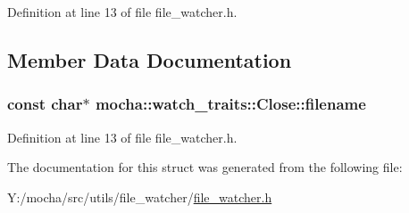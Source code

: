 Definition at line 13 of file file\_\-watcher.h.



\subsection{Member Data Documentation}
\hypertarget{structmocha_1_1watch__traits_1_1_close_a17079e4e7c253c7b27ca9c8a4ea17e28}{
\subsubsection[{filename}]{\setlength{\rightskip}{0pt plus 5cm}const char$\ast$ {\bf mocha::watch\_\-traits::Close::filename}}}
\label{structmocha_1_1watch__traits_1_1_close_a17079e4e7c253c7b27ca9c8a4ea17e28}


Definition at line 13 of file file\_\-watcher.h.



The documentation for this struct was generated from the following file:\begin{DoxyCompactItemize}
\item 
Y:/mocha/src/utils/file\_\-watcher/\hyperlink{file__watcher_8h}{file\_\-watcher.h}\end{DoxyCompactItemize}

